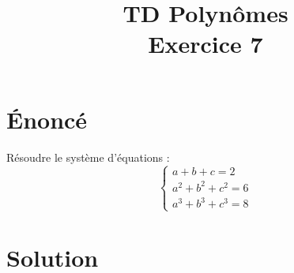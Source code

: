 \documentclass[french]{article}
\title{TD Polynômes \\ Exercice 7}
\date{}
\begin{document}
\maketitle

\section{Énoncé}
Résoudre le système d'équations : $$\begin{cases}
	a+b+c=2 \\
	a^2+b^2+c^2=6 \\
	a^3+b^3+c^3=8
\end{cases}$$
\section{Solution}
\end{document}
